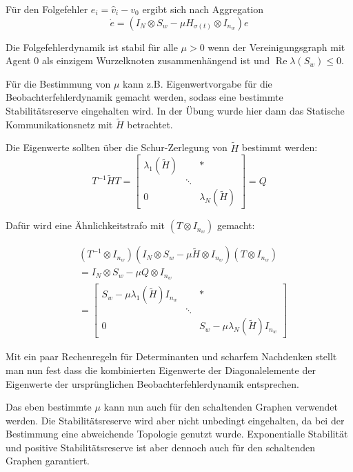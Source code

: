 Für den Folgefehler $e_i = \hat{v}_i - v_0$ ergibt sich nach Aggregation
\begin{equation}
    \dot{e} = (I_N \otimes S_w - \mu H_{\sigma(t)} \otimes I_{n_w}) e
\end{equation}

Die Folgefehlerdynamik ist stabil für alle $\mu > 0$ wenn der Vereinigungsgraph
mit Agent 0 als einzigem Wurzelknoten zusammenhängend ist und
$\operatorname{Re}\lambda(S_w) \leq 0$.

Für die Bestimmung von $\mu$ kann z.B. Eigenwertvorgabe für die
Beobachterfehlerdynamik gemacht werden, sodass eine bestimmte
Stabilitätsreserve eingehalten wird.
In der Übung wurde hier dann das Statische Kommunikationsnetz
mit $\tilde{H}$ betrachtet.

Die Eigenwerte sollten über die Schur-Zerlegung von $\tilde{H}$
bestimmt werden:
\begin{equation}
    T^{-1}\tilde{H}T = \begin{bmatrix}
        \lambda_1(\tilde{H}) & &* \\
        & \ddots & \\
        0 & & \lambda_N(\tilde{H})
    \end{bmatrix}=Q
\end{equation}

Dafür wird eine Ähnlichkeitstrafo mit $(T\otimes I_{n_w})$ gemacht:

\begin{align}
    &(T^{-1} \otimes I_{n_w})(I_N \otimes S_w - \mu \tilde{H} \otimes I_{n_w})(T\otimes I_{n_w}) \\
    &= I_N \otimes S_w - \mu Q \otimes I_{n_w} \\
    &= \begin{bmatrix}
        S_w - \mu \lambda_1(\tilde{H}) I_{n_w} & &*\\
        & \ddots & \\
        0 & & S_w - \mu \lambda_N(\tilde{H}) I_{n_w}
    \end{bmatrix}
\end{align}

Mit ein paar Rechenregeln für Determinanten und scharfem Nachdenken stellt man
nun fest dass die kombinierten Eigenwerte der Diagonalelemente der Eigenwerte
der ursprünglichen Beobachterfehlerdynamik entsprechen.

Das eben bestimmte $\mu$ kann nun auch für den schaltenden Graphen verwendet
werden. Die Stabilitätsreserve wird aber nicht unbedingt eingehalten, da bei der
Bestimmung eine abweichende Topologie genutzt wurde.
Exponentialle Stabilität und positive Stabilitätsreserve ist aber dennoch auch
für den schaltenden Graphen garantiert.
